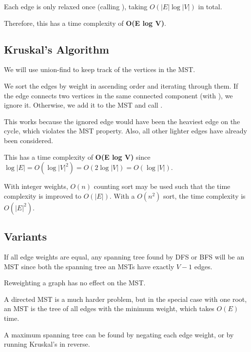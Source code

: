 Each edge is only relaxed once (calling ), taking $O(|E| \log |V|)$ in total.

Therefore, this has a time complexity of \textbf{O(E log V)}.

\subsection{Kruskal's Algorithm}
We will use union-find to keep track of the vertices in the MST.

We sort the edges by weight in ascending order and iterating through them.
If the edge connects two vertices in the same connected component (with ), we ignore it.
Otherwise, we add it to the MST and call .

This works because the ignored edge would have been the heaviest edge on the cycle,
which violates the MST property.
Also, all other lighter edges have already been considered.

This has a time complexity of \textbf{O(E log V)} since $\log |E| = O(\log |V|^2) = O(2 \log |V|) = O(\log |V|)$.

With integer weights, $O(n)$ counting sort may be used such that the time complexity is improved to $O(|E|)$.
With a $O(n^2)$ sort, the time complexity is $O(|E|^2)$.

\subsection{Variants}
If all edge weights are equal, any spanning tree found by DFS or BFS will be an MST since
both the spanning tree an MSTs have exactly $V - 1$ edges.

Reweighting a graph has no effect on the MST.

A directed MST is a much harder problem, but in the special case with one root, an MST is
the tree of all edges with the minimum weight, which takes $O(E)$ time.

A maximum spanning tree can be found by negating each edge weight, or by running Kruskal's in reverse.